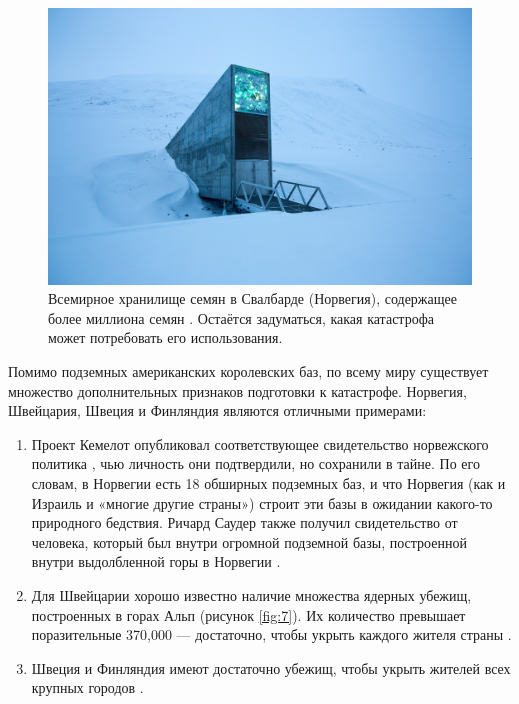 \documentclass[10pt,twocolumn,letterpaper]{article}
\begin{document}
\begin{figure}[t]
\begin{center}
   \includegraphics[width=1\linewidth]{svalbard.jpg}

\end{center}
   \caption{Всемирное хранилище семян в Свалбарде (Норвегия), содержащее более миллиона семян \cite{24}. Остаётся задуматься, какая катастрофа может потребовать его использования.}
\label{fig:8}
\label{fig:onecol}
\end{figure}

Помимо подземных американских королевских баз, по всему миру существует множество дополнительных признаков подготовки к катастрофе. Норвегия, Швейцария, Швеция и Финляндия являются отличными примерами:

\begin{flushleft}
\begin{enumerate}
    \item Проект Кемелот опубликовал соответствующее свидетельство норвежского политика \cite{25,26}, чью личность они подтвердили, но сохранили в тайне. По его словам, в Норвегии есть 18 обширных подземных баз, и что Норвегия (как и Израиль и «многие другие страны») строит эти базы в ожидании какого-то природного бедствия. Ричард Саудер также получил свидетельство от человека, который был внутри огромной подземной базы, построенной внутри выдолбленной горы в Норвегии \cite{22}.
    \item Для Швейцарии хорошо известно наличие множества ядерных убежищ, построенных в горах Альп (рисунок \ref{fig:7}). Их количество превышает поразительные 370,000 — достаточно, чтобы укрыть каждого жителя страны \cite{27}.
    \item Швеция и Финляндия имеют достаточно убежищ, чтобы укрыть жителей всех крупных городов \cite{27}. 
\end{enumerate}
\end{flushleft}
\end{document}

